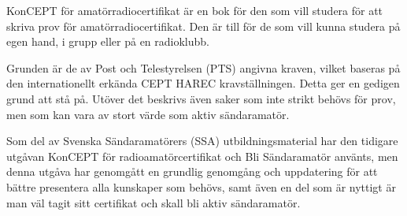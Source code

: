 \newpage
\AddToShipoutPicture*{\BackgroundPicLast}

\color{white}
KonCEPT för amatörradiocertifikat är en bok för den som vill studera för att
skriva prov för amatörradiocertifikat. Den är till för de som vill kunna studera
på egen hand, i grupp eller på en radioklubb.

Grunden är de av Post och Telestyrelsen (PTS) angivna kraven, vilket baseras på
den internationellt erkända CEPT HAREC kravställningen. Detta ger en gedigen
grund att stå på. Utöver det beskrivs även saker som inte strikt behövs för
prov, men som kan vara av stort värde som aktiv sändaramatör.

Som del av Svenska Sändaramatörers (SSA) utbildningsmaterial har den tidigare
utgåvan KonCEPT för radioamatörcertifikat och Bli Sändaramatör använts, men
denna utgåva har genomgått en grundlig genomgång och uppdatering för att
bättre presentera alla kunskaper som behövs, samt även en del som är nyttigt
är man väl tagit sitt certifikat och skall bli aktiv sändaramatör.
